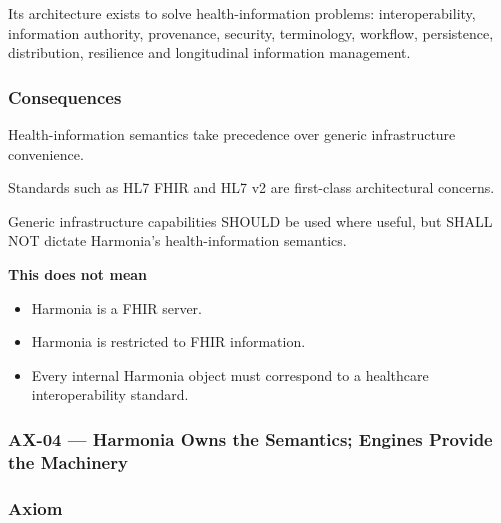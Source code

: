 Its architecture exists to solve health-information problems: interoperability, information authority, provenance, security, terminology, workflow, persistence, distribution, resilience and longitudinal information management.

\label{rad:axioms:99}
\subsubsection*{Consequences}
\label{rad:axioms:101}

Health-information semantics take precedence over generic infrastructure convenience.

\label{rad:axioms:104}

Standards such as HL7 FHIR and HL7 v2 are first-class architectural concerns.

\label{rad:axioms:107}

Generic infrastructure capabilities SHOULD be used where useful, but SHALL NOT dictate Harmonia's health-information semantics.

\label{rad:axioms:110}

\textbf{This does not mean}

\label{rad:axioms:112}

\begin{itemize}

\item
Harmonia is a FHIR server.



\item
Harmonia is restricted to FHIR information.



\item
Every internal Harmonia object must correspond to a healthcare interoperability standard.



\end{itemize}
\label{rad:axioms:116}



\label{rad:axioms:204}
\subsubsection*{AX-04 --- Harmonia Owns the Semantics; Engines Provide the Machinery}
\label{rad:axioms:206}
\subsubsection*{Axiom}
\label{rad:axioms:208}

